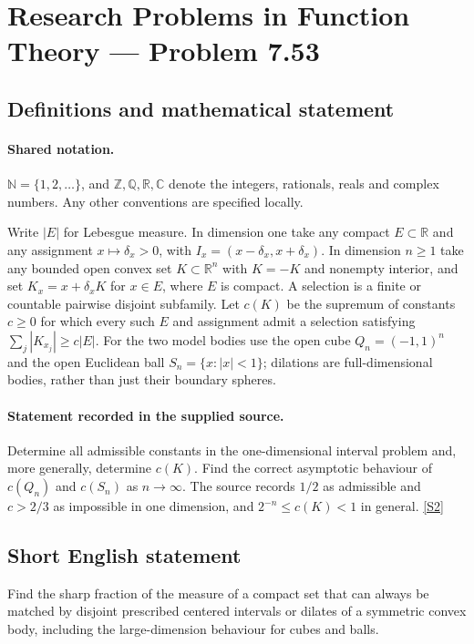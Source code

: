 \documentclass[11pt]{article}
\newcommand{\sref}[2]{\hyperlink{source:#1:#2}{[S#2]}}
\begin{document}
\section{Research Problems in Function Theory — Problem 7.53}\label{statement}

\subsection{Definitions and mathematical statement}

\paragraph{Shared notation.}$\mathbb N=\{1,2,\ldots\}$, and $\mathbb Z,\mathbb Q,\mathbb R,\mathbb C$ denote the integers, rationals, reals and complex numbers. Any other conventions are specified locally.


Write $|E|$ for Lebesgue measure. In dimension one take any compact $E\subset\mathbb R$ and any assignment $x\mapsto\delta_x>0$, with $I_x=(x-\delta_x,x+\delta_x)$. In dimension $n\ge1$ take any bounded open convex set $K\subset\mathbb R^n$ with $K=-K$ and nonempty interior, and set $K_x=x+\delta_xK$ for $x\in E$, where $E$ is compact. A selection is a finite or countable pairwise disjoint subfamily. Let $c(K)$ be the supremum of constants $c\ge0$ for which every such $E$ and assignment admit a selection satisfying $\sum_j|K_{x_j}|\ge c|E|$. For the two model bodies use the open cube $Q_n=(-1,1)^n$ and the open Euclidean ball $S_n=\{x:|x|<1\}$; dilations are full-dimensional bodies, rather than just their boundary spheres.
\paragraph{Statement recorded in the supplied source.}
Determine all admissible constants in the one-dimensional interval problem and, more generally, determine $c(K)$. Find the correct asymptotic behaviour of $c(Q_n)$ and $c(S_n)$ as $n\to\infty$. The source records $1/2$ as admissible and $c>2/3$ as impossible in one dimension, and $2^{-n}\le c(K)<1$ in general. \sref{statement}{2}
\subsection{Short English statement}
Find the sharp fraction of the measure of a compact set that can always be matched by disjoint prescribed centered intervals or dilates of a symmetric convex body, including the large-dimension behaviour for cubes and balls.
\end{document}
